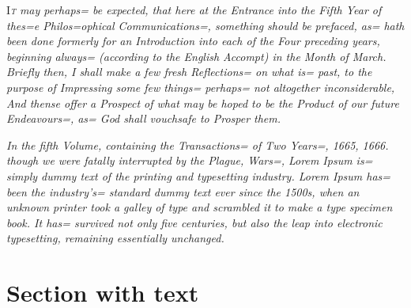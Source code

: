 \documentclass{scrarticle}
\newcommand{\initfamily}{\fontencoding{U}\fontfamily{GoudyIn}\selectfont}
\begin{document}
\setcounter{page}{893}


\lettrine[lines=4,findent=0pt,nindent=0em]{{\initfamily I}}{\textit{t}} \textit{may perhaps= be expected, that here at the Entrance into the \emph{Fifth} Year of thes=e Philos=ophical Communications=, something should be prefaced, as= hath been done formerly for an Introduction into each of the Four preceding years, beginning always= \emph{(}according to the \emph{English} Accompt\emph{)} in the Month of \emph{March}. Briefly then, I shall make a few fresh Reflections= on what is= past, to the purpose of Impressing some few things= perhaps= not altogether inconsiderable, And thense offer a Prospect of what may be hoped to be the Product of our future Endeavours=, as= God shall vouchsafe to Prosper them.}

\textit{In the \emph{fifth} Volume, containing the Transactions= of \emph{Two} Years=, 1665, 1666. though we were fatally interrupted by the \emph{Plague}, \emph{Wars=}, Lorem Ipsum is= simply dummy text of the printing and typesetting industry. Lorem Ipsum has= been the industry's= standard dummy text ever since the 1500s, when an unknown printer took a galley of type and scrambled it to make a type specimen book. It has= survived not only five centuries, but also the leap into electronic typesetting, remaining essentially unchanged. }

\section{Section with text}

\textit{\blindmathpaper}
\end{document}

